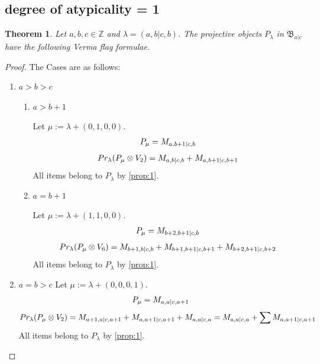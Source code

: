 \documentclass[12pt,a4paper]{article}
\newtheorem{theorem}{Theorem}[section]
\begin{document}
\subsection{degree of atypicality = 1}

\begin{theorem}
  Let $a,b,c \in \mathbb{Z}$ and $\lambda = (a,b|c,b)$. The projective objects $P_{\lambda}$ in $\mathfrak{B}_{a|c}$ have the following Verma flag formulae.
\end{theorem}
\begin{proof} The Cases are as follows:\par
\begin{enumerate}
  \item $a>b>c$
    \begin{enumerate}
      \item $a>b+1$ \par
      Let $\mu:=\lambda + (0,1,0,0) $. 
\begin{equation}\notag
  \begin{aligned}
      P_{\mu} = M_{a,b+1|c,b}
  \end{aligned}
\end{equation}
\begin{equation}\notag
  \begin{aligned}
    Pr_{\lambda}(P_\mu \otimes V_2) =
M_{a,b|c,b}
+M_{a,b+1|c,b+1}
  \end{aligned}
\end{equation}
All items belong to $P_\lambda$ by \cref{prop:1}.

      \item $a=b+1$ \par
      Let $\mu:=\lambda + (1,1,0,0) $. 
\begin{equation}\notag
  \begin{aligned}
      P_{\mu} =  M_{b+2,b+1|c,b}
  \end{aligned}
\end{equation}
\begin{equation}\notag
  \begin{aligned}
    Pr_{\lambda}(P_\mu \otimes V_6) =
    M_{b+1,b|c,b}
+M_{b+1,b+1|c,b+1}
+M_{b+2,b+1|c,b+2}
  \end{aligned}
\end{equation}
All items belong to $P_\lambda$ by \cref{prop:1}.
    \end{enumerate}

  \item $a=b>c$
      Let $\mu:=\lambda + (0,0,0,1) $. 
\begin{equation}\notag
  \begin{aligned}
      P_{\mu} = M_{a,a|c,a+1}
  \end{aligned}
\end{equation}
\begin{equation}\notag
  \begin{aligned}
    Pr_{\lambda}(P_\mu \otimes V_2) =
M_{a+1,a|c,a+1}
+M_{a,a+1|c,a+1}
+M_{a,a|c,a} 
= M_{a,a|c,a}
+\sum M_{a,a+1|c,a+1}
  \end{aligned}
\end{equation}
All items belong to $P_\lambda$ by \cref{prop:1}.



\end{enumerate}
\end{proof}
\end{document}
